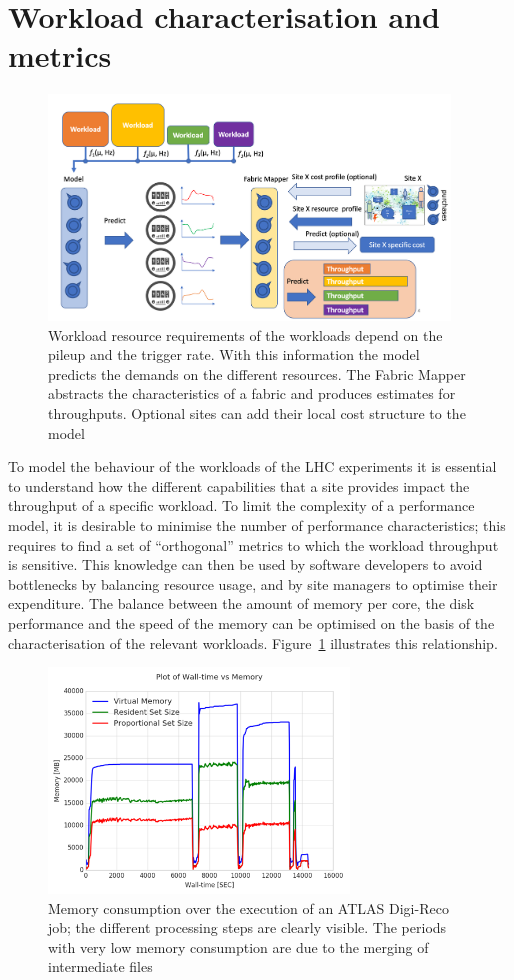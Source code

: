 \section{Workload characterisation and metrics}
\begin{figure}[h]
  \centering
  \includegraphics[height=6cm]{CHEP-Model-2.png}
  \caption{Workload resource requirements of the workloads depend on
    the pileup and the trigger rate.  With this information the
    model predicts the demands on the different resources. The Fabric
    Mapper abstracts the characteristics of a fabric and produces
    estimates for throughputs. Optional sites can add their local cost
    structure to the model}
  \label{fig:mapping}
\end{figure}

To model the behaviour of the workloads of the LHC experiments it is
essential to understand how the different capabilities that a site
provides impact the throughput of a specific workload. To limit the
complexity of a performance model, it is desirable to minimise the
number of performance characteristics; this requires to find a set of
``orthogonal'' metrics to which the workload throughput is
sensitive. This knowledge can then be used by software developers to
avoid bottlenecks by balancing resource usage, and by site managers to
optimise their expenditure. The balance between the amount of memory
per core, the disk performance and the speed of the memory can be
optimised on the basis of the characterisation of the relevant
workloads. Figure~\ref{fig:mapping} illustrates this relationship.

\begin{figure}[h]
  \centering
  \includegraphics[height=6cm]{prmon.png}
  \caption{Memory consumption over the execution of an ATLAS Digi-Reco
    job; the different processing steps are clearly visible. The periods
    with very low memory consumption are due to the merging of
    intermediate files}
  \label{fig:prmon}
\end{figure}

